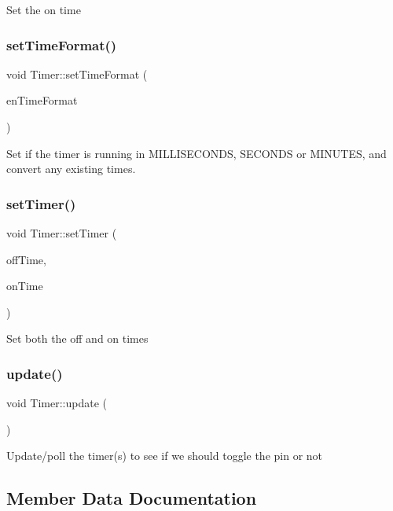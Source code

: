 Set the on time\hypertarget{class_timer_af8a1b1c47ee6812ddb29cd83deafaf36}{}\label{class_timer_af8a1b1c47ee6812ddb29cd83deafaf36} 
\subsubsection{\texorpdfstring{set\+Time\+Format()}{setTimeFormat()}}
{\footnotesize\ttfamily void Timer\+::set\+Time\+Format (\begin{DoxyParamCaption}\item[{\hyperlink{_timer_8h_add9fe45e09605eee3e4a39c8a5c4476d}{Time\+Unit}}]{en\+Time\+Format }\end{DoxyParamCaption})}

Set if the timer is running in M\+I\+L\+L\+I\+S\+E\+C\+O\+N\+DS, S\+E\+C\+O\+N\+DS or M\+I\+N\+U\+T\+ES, and convert any existing times.\hypertarget{class_timer_a1a3d438cfafc29ab392e68eeea8c1952}{}\label{class_timer_a1a3d438cfafc29ab392e68eeea8c1952} 
\subsubsection{\texorpdfstring{set\+Timer()}{setTimer()}}
{\footnotesize\ttfamily void Timer\+::set\+Timer (\begin{DoxyParamCaption}\item[{unsigned long}]{off\+Time,  }\item[{unsigned long}]{on\+Time }\end{DoxyParamCaption})}

Set both the off and on times\hypertarget{class_timer_a745ad59b5a46744cd871a1129a25d74f}{}\label{class_timer_a745ad59b5a46744cd871a1129a25d74f} 
\subsubsection{\texorpdfstring{update()}{update()}}
{\footnotesize\ttfamily void Timer\+::update (\begin{DoxyParamCaption}{ }\end{DoxyParamCaption})}

Update/poll the timer(s) to see if we should toggle the pin or not

\subsection{Member Data Documentation}
\hypertarget{class_timer_a420f780693d99cab0cad9ae8202d834e}{}\label{class_timer_a420f780693d99cab0cad9ae8202d834e} 
